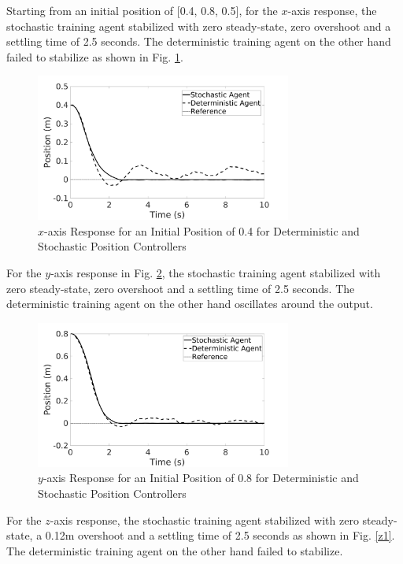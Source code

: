    Starting from an initial position of [0.4, 0.8, 0.5], for the $x$-axis response, the stochastic training agent stabilized with zero steady-state, zero overshoot and a settling time of 2.5 seconds. The deterministic training agent on the other hand failed to stabilize as shown in Fig. \ref{X1}.
    \begin{figure}[H]
            \centering
            \includegraphics[width=0.75\textwidth]{plots/x1.jpg}
            \caption{$x$-axis Response for an Initial Position of 0.4 for Deterministic and Stochastic Position Controllers}
            \label{X1}
    \end{figure}\clearpage
    For the $y$-axis response in Fig. \ref{y1}, the stochastic training agent stabilized with zero steady-state, zero overshoot and a settling time of 2.5 seconds. The deterministic training agent on the other hand oscillates around the output.
    \begin{figure}[H]
            \centering
            \includegraphics[width=0.75\textwidth]{plots/y1.jpg}
            \caption{$y$-axis Response for an Initial Position of 0.8 for Deterministic and Stochastic Position Controllers}
            \label{y1}
    \end{figure}
    For the $z$-axis response, the stochastic training agent stabilized with zero steady-state, a 0.12m overshoot and a settling time of 2.5 seconds as shown in Fig. \ref{z1}. The deterministic training agent on the other hand failed to stabilize.
